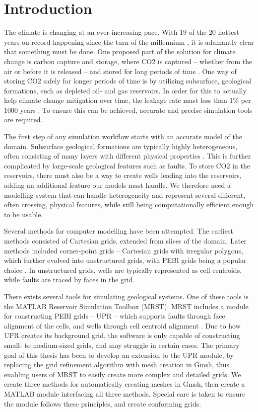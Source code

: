 \section{Introduction}
The climate is changing at an ever-increasing pace. With 19 of the 20 hottest years on record happening since the turn of the millennium \cite{NASA-climate}, it is adamantly clear that something must be done. One proposed part of the solution for climate change is carbon capture and storage, where CO2 is captured -- whether from the air or before it is released -- and stored for long periods of time \cite{climate-mitigation}. One way of storing CO2 safely for longer periods of time is by utilizing subsurface, geological formations, such as depleted oil- and gas reservoirs. In order for this to actually help climate change mitigation over time, the leakage rate must less than 1\% per 1000 years \cite{Shaffer-CO2-capture}. To ensure this can be achieved, accurate and precise simulation tools are required.

The first step of any simulation workflow starts with an accurate model of the domain. Subsurface geological formations are typically highly heterogeneous, often consisting of many layers with different physical properties \cite{UPR_thesis}. This is further complicated by large-scale geological features such as faults. To store CO2 in the reservoirs, there must also be a way to create wells leading into the reservoirs, adding an additional feature our models must handle. We therefore need a modelling system that can handle heterogeneity and represent several different, often crossing, physical features, while still being computationally efficient enough to be usable.

Several methods for computer modelling have been attempted. The earliest methods consisted of Cartesian grids, extended from slices of the domain. Later methods included corner-point grids \cite{corner-point} -- Cartesian grids with irregular polygons, which further evolved into unstructured grids, with PEBI grids being a popular choice \cite{UPR_thesis}. In unstructured grids, wells are typically represented as cell centroids, while faults are traced by faces in the grid.

There exists several tools for simulating geological systems. One of these tools is the MATLAB Reservoir Simulation Toolbox (MRST). MRST includes a module for constructing PEBI grids -- UPR -- which supports faults through face alignment of the cells, and wells through cell centroid alignment \cite{UPR_chapter}. Due to how UPR creates its background grid, the software is only capable of constructing small- to medium-sized grids, and may struggle in certain cases. The primary goal of this thesis has been to develop an extension to the UPR module, by replacing the grid refinement algorithm with mesh creation in Gmsh, thus enabling users of MRST to easily create more complex and detailed grids. We create three methods for automatically creating meshes in Gmsh, then create a MATLAB module interfacing all three methods. Special care is taken to ensure the module follows these principles, and create conforming grids.

